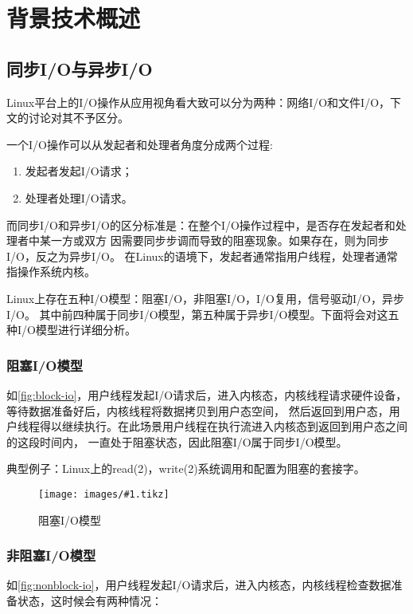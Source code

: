 \documentclass[supercite]{HustGraduPaper}
\newcommand{\cfig}[3]{
  \begin{figure}[htb]
    \centering
    \texttt{[image: images/\#1.tikz]}
    \caption{#3}
    \label{fig:#1}
  \end{figure}
}
\newcommand{\rfig}[1]{\autoref{fig:#1}}
\theoremstyle{definition}
\begin{document}
\section{背景技术概述}
\subsection{同步I/O与异步I/O}
Linux平台上的I/O操作从应用视角看大致可以分为两种：网络I/O和文件I/O，下文的讨论对其不予区分。\par

一个I/O操作可以从发起者和处理者角度分成两个过程:
\begin{enumerate}[label={(\arabic*)}]
    \item 发起者发起I/O请求；
    \item 处理者处理I/O请求。
\end{enumerate}\par

而同步I/O和异步I/O的区分标准是：在整个I/O操作过程中，是否存在发起者和处理者中某一方或双方
因需要同步步调而导致的阻塞现象。如果存在，则为同步I/O，反之为异步I/O。
在Linux的语境下，发起者通常指用户线程，处理者通常指操作系统内核。\par

Linux上存在五种I/O模型：阻塞I/O，非阻塞I/O，I/O复用，信号驱动I/O，异步I/O。
其中前四种属于同步I/O模型，第五种属于异步I/O模型。下面将会对这五种I/O模型进行详细分析。\par

\subsubsection{阻塞I/O模型}
如\rfig{block-io}，用户线程发起I/O请求后，进入内核态，内核线程请求硬件设备，等待数据准备好后，内核线程将数据拷贝到用户态空间，
然后返回到用户态，用户线程得以继续执行。在此场景用户线程在执行流进入内核态到返回到用户态之间的这段时间内，
一直处于阻塞状态，因此阻塞I/O属于同步I/O模型。\par

典型例子：Linux上的read(2)，write(2)系统调用和配置为阻塞的套接字。\par

\cfig{block-io}{0.5}{阻塞I/O模型}

\subsubsection{非阻塞I/O模型}
如\rfig{nonblock-io}，用户线程发起I/O请求后，进入内核态，内核线程检查数据准备状态，这时候会有两种情况：
\end{document}
